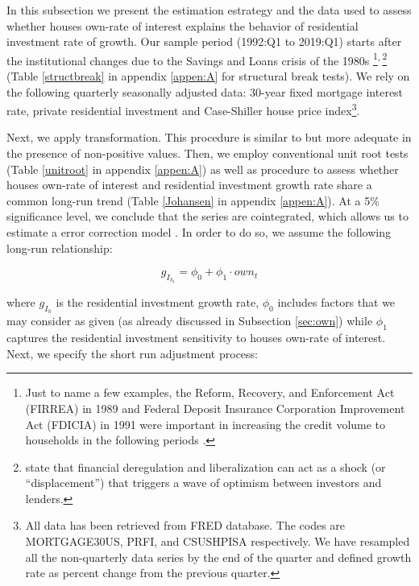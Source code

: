 \documentclass[12pt, a4paper]{article}
\begin{document}
In this subsection we present the estimation estrategy and the data used to assess whether houses own-rate of interest explains the behavior of residential investment rate of growth.
Our sample period (1992:Q1 to 2019:Q1) starts after the institutional changes due to the Savings and Loans crisis of the 1980s \footnote{Just to name a few examples, the Reform, Recovery, and Enforcement Act (FIRREA) in 1989 and Federal Deposit Insurance Corporation Improvement Act (FDICIA) in 1991 were important in increasing the credit volume to households in the following periods \parencite{wall_too_2010}.}\textsuperscript{,}\,\footnote{\textcite[p.~37 and 45]{kindleberger_2005_Manias} state that  financial deregulation and liberalization can act as a shock (or ``displacement'') that triggers a wave of optimism between investors and lenders.} (Table \ref{structbreak} in appendix \ref{appen:A} for structural break tests).
We rely on the following  quarterly seasonally adjusted data: 30-year fixed mortgage interest rate, private residential investment and Case-Shiller house price index\footnote{All data has been retrieved from FRED database. The codes are MORTGAGE30US, PRFI, and CSUSHPISA respectively. We have resampled all the non-quarterly data series by the end of the quarter and defined growth rate as percent change from the previous quarter.}.


Next, we apply \textcite{yeo_new_2000} transformation.
This procedure is similar to \textcite{box_analysis_1964} but more adequate in the presence of non-positive values.
Then, we employ conventional unit root tests (Table \ref{unitroot} in appendix \ref{appen:A}) as well as \textcite{johansen_estimation_1991} procedure to assess whether houses own-rate of interest and residential investment growth rate share a common long-run trend (Table \ref{Johansen} in appendix \ref{appen:A}).
At a 5\% significance level, we conclude that the series are cointegrated, which allows us to estimate a error correction model \parencite{enders_applied_2014}.
In order to do so, we assume the following long-run relationship:

\begin{latex}
\begin{equation}
\label{gihLR}
g_{I_{h_{t}}} = \phi_{0} + \phi_{1}\cdot own_{t}
\end{equation}
\end{latex}
where \(g_{I_{h}}\) is the residential investment growth rate, \(\phi_0\) includes factors that we may consider as given (as already discussed in Subsection \ref{sec:own}) while \(\phi_1\) captures the residential investment sensitivity to houses own-rate of interest.
Next, we specify the short run adjustment process:
\end{document}
